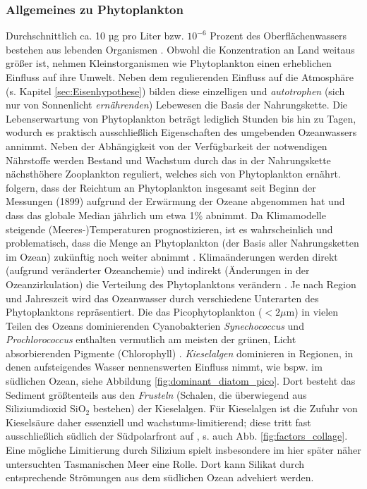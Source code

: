 \documentclass[12pt,a4paper,onecolumn]{scrartcl}
\begin{document}
\subsubsection{Allgemeines zu Phytoplankton} \label{sec:Phytobasics}
Durchschnittlich ca. 10 µg pro Liter bzw. $10^{-6}$ Prozent des Oberflächenwassers bestehen aus lebenden Organismen \citep{Emerson.2009}. Obwohl die Konzentration an Land weitaus größer ist, nehmen Kleinstorganismen wie Phytoplankton einen erheblichen Einfluss auf ihre Umwelt. Neben dem regulierenden Einfluss auf die Atmosphäre (s. Kapitel \ref{sec:Eisenhypothese}) bilden diese einzelligen und \textit{autotrophen} (sich nur von Sonnenlicht \textit{ernährenden}) Lebewesen die Basis der Nahrungskette. Die Lebenserwartung von Phytoplankton beträgt lediglich Stunden bis hin zu Tagen, wodurch es praktisch ausschließlich Eigenschaften des umgebenden Ozeanwassers annimmt. Neben der Abhängigkeit von der Verfügbarkeit der notwendigen Nährstoffe werden Bestand und Wachstum durch das in der Nahrungskette nächsthöhere Zooplankton reguliert, welches sich von Phytoplankton ernährt. \citet{Boyce.2010} folgern, dass der Reichtum an Phytoplankton insgesamt seit Beginn der Messungen (1899) aufgrund der Erwärmung der Ozeane abgenommen hat und dass das globale Median jährlich um etwa 1\% abnimmt. Da Klimamodelle steigende (Meeres-)Temperaturen prognostizieren, ist es wahrscheinlich und problematisch, dass die Menge an Phytoplankton (der Basis aller Nahrungsketten im Ozean) zukünftig noch weiter abnimmt \citep{Siegel.2010}. Klimaänderungen werden direkt (aufgrund veränderter Ozeanchemie) und indirekt (Änderungen in der Ozeanzirkulation) die Verteilung des Phytoplanktons verändern \citep{Falkowski.1998}. Je nach Region und Jahreszeit wird das Ozeanwasser durch verschiedene Unterarten des Phytoplanktons repräsentiert. Die das Picophytoplankton ($<2\mu$m) in vielen Teilen des Ozeans dominierenden Cyanobakterien \textit{Synechococcus} und \textit{Prochlorococcus} enthalten vermutlich am meisten der grünen, Licht absorbierenden Pigmente (Chlorophyll) \citep{Emerson.2009}. \textit{Kieselalgen} dominieren in Regionen, in denen aufsteigendes Wasser nennenswerten Einfluss nimmt, wie bspw. im südlichen Ozean, siehe Abbildung \ref{fig:dominant_diatom_pico}. Dort besteht das Sediment größtenteils aus den \textit{Frusteln} (Schalen, die überwiegend aus Siliziumdioxid SiO$_2$ bestehen) der Kieselalgen. Für Kieselalgen ist die Zufuhr von Kieselsäure daher essenziell und wachstums-limitierend; diese tritt fast ausschließlich südlich der Südpolarfront auf \citep{Falkowski.1998}, s. auch Abb. \ref{fig:factors_collage}. Eine mögliche Limitierung durch Silizium spielt insbesondere im  hier später näher untersuchten Tasmanischen Meer eine Rolle. Dort kann Silikat durch entsprechende Strömungen aus dem südlichen Ozean advehiert werden.
\end{document}
